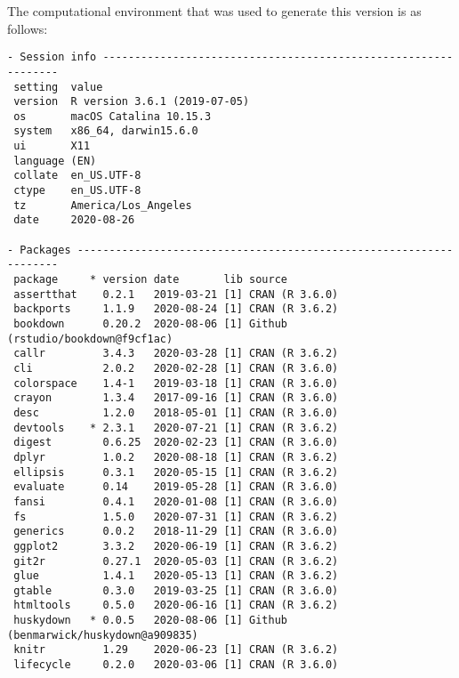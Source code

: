 \documentclass [11pt, proquest] {uwthesis}[2015/03/03]
\begin{document}
The computational environment that was used to generate this version is
as follows:
\begin{verbatim}
- Session info ---------------------------------------------------------------
 setting  value                       
 version  R version 3.6.1 (2019-07-05)
 os       macOS Catalina 10.15.3      
 system   x86_64, darwin15.6.0        
 ui       X11                         
 language (EN)                        
 collate  en_US.UTF-8                 
 ctype    en_US.UTF-8                 
 tz       America/Los_Angeles         
 date     2020-08-26                  

- Packages -------------------------------------------------------------------
 package     * version date       lib source                               
 assertthat    0.2.1   2019-03-21 [1] CRAN (R 3.6.0)                       
 backports     1.1.9   2020-08-24 [1] CRAN (R 3.6.2)                       
 bookdown      0.20.2  2020-08-06 [1] Github (rstudio/bookdown@f9cf1ac)    
 callr         3.4.3   2020-03-28 [1] CRAN (R 3.6.2)                       
 cli           2.0.2   2020-02-28 [1] CRAN (R 3.6.0)                       
 colorspace    1.4-1   2019-03-18 [1] CRAN (R 3.6.0)                       
 crayon        1.3.4   2017-09-16 [1] CRAN (R 3.6.0)                       
 desc          1.2.0   2018-05-01 [1] CRAN (R 3.6.0)                       
 devtools    * 2.3.1   2020-07-21 [1] CRAN (R 3.6.2)                       
 digest        0.6.25  2020-02-23 [1] CRAN (R 3.6.0)                       
 dplyr         1.0.2   2020-08-18 [1] CRAN (R 3.6.2)                       
 ellipsis      0.3.1   2020-05-15 [1] CRAN (R 3.6.2)                       
 evaluate      0.14    2019-05-28 [1] CRAN (R 3.6.0)                       
 fansi         0.4.1   2020-01-08 [1] CRAN (R 3.6.0)                       
 fs            1.5.0   2020-07-31 [1] CRAN (R 3.6.2)                       
 generics      0.0.2   2018-11-29 [1] CRAN (R 3.6.0)                       
 ggplot2       3.3.2   2020-06-19 [1] CRAN (R 3.6.2)                       
 git2r         0.27.1  2020-05-03 [1] CRAN (R 3.6.2)                       
 glue          1.4.1   2020-05-13 [1] CRAN (R 3.6.2)                       
 gtable        0.3.0   2019-03-25 [1] CRAN (R 3.6.0)                       
 htmltools     0.5.0   2020-06-16 [1] CRAN (R 3.6.2)                       
 huskydown   * 0.0.5   2020-08-06 [1] Github (benmarwick/huskydown@a909835)
 knitr         1.29    2020-06-23 [1] CRAN (R 3.6.2)                       
 lifecycle     0.2.0   2020-03-06 [1] CRAN (R 3.6.0)                       

\end{verbatim}
\end{document}
